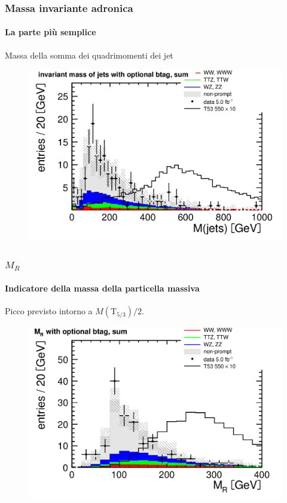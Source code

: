 \documentclass[italian]{beamer}
\begin{document}
\begin{frame}
    \frametitle{Massa invariante adronica}
    \framesubtitle{La parte pi\`u semplice}
    \begin{block}{}
        Massa della somma dei quadrimomenti dei jet
    \end{block}
        \begin{figure}[h]
            \centering
            \includegraphics[width=.7\textwidth]{had_mass_optional_btag_sum}
        \end{figure}
\end{frame}

\begin{frame}
    \frametitle{$M_R$}
    \framesubtitle{Indicatore della massa della particella massiva}
    \begin{block}{}
        Picco previsto intorno a $M(\mathrm{T}_{5/3})/2$.
    \end{block}
        \begin{figure}[h]
            \centering
            \includegraphics[width=.7\textwidth]{mr_optional_btag_sum}
        \end{figure}
\end{frame}
\end{document}
